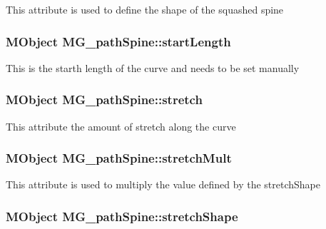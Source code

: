 This attribute is used to define the shape of the squashed spine \hypertarget{class_m_g__path_spine_a406a9df2d612bd346d3f7aac59646470}{
\subsubsection[{start\-Length}]{\setlength{\rightskip}{0pt plus 5cm}M\-Object M\-G\-\_\-path\-Spine\-::start\-Length\hspace{0.3cm}{\ttfamily [static]}}}\label{class_m_g__path_spine_a406a9df2d612bd346d3f7aac59646470}
This is the starth length of the curve and needs to be set manually \hypertarget{class_m_g__path_spine_a56805052d8bd4e130c192b000b750efc}{
\subsubsection[{stretch}]{\setlength{\rightskip}{0pt plus 5cm}M\-Object M\-G\-\_\-path\-Spine\-::stretch\hspace{0.3cm}{\ttfamily [static]}}}\label{class_m_g__path_spine_a56805052d8bd4e130c192b000b750efc}
This attribute the amount of stretch along the curve \hypertarget{class_m_g__path_spine_acfb6a9d96aadcc5630153819140993bb}{
\subsubsection[{stretch\-Mult}]{\setlength{\rightskip}{0pt plus 5cm}M\-Object M\-G\-\_\-path\-Spine\-::stretch\-Mult\hspace{0.3cm}{\ttfamily [static]}}}\label{class_m_g__path_spine_acfb6a9d96aadcc5630153819140993bb}
This attribute is used to multiply the value defined by the stretch\-Shape \hypertarget{class_m_g__path_spine_a552a798b225b9aa4924e8d0d2c421843}{
\subsubsection[{stretch\-Shape}]{\setlength{\rightskip}{0pt plus 5cm}M\-Object M\-G\-\_\-path\-Spine\-::stretch\-Shape\hspace{0.3cm}{\ttfamily [static]}}}\label{class_m_g__path_spine_a552a798b225b9aa4924e8d0d2c421843}
